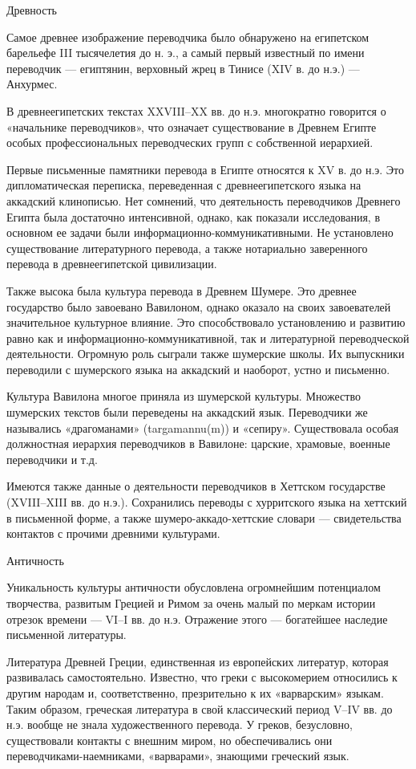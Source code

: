 Древность

Самое древнее изображение переводчика было обнаружено на египетском барельефе III тысячелетия до н. э., а самый первый известный по имени переводчик --- египтянин, верховный жрец в Тинисе (XIV в. до н.э.) --- Анхурмес.

В древнеегипетских текстах XXVIII--XX вв. до н.э. многократно говорится о «начальнике переводчиков», что означает существование в Древнем Египте особых профессиональных переводческих групп с собственной иерархией.

Первые письменные памятники перевода в Египте относятся к XV в. до н.э. Это дипломатическая переписка, переведенная с древнеегипетского языка на аккадский клинописью. Нет сомнений, что деятельность переводчиков Древнего Египта была достаточно интенсивной, однако, как показали исследования, в основном ее задачи были информационно-коммуникативными. Не установлено существование литературного перевода, а также нотариально заверенного перевода в древнеегипетской цивилизации.

Также высока была культура перевода в Древнем Шумере. Это древнее государство было завоевано Вавилоном, однако оказало на своих завоевателей значительное культурное влияние. Это способствовало установлению и развитию равно как и информационно-коммуникативной, так и литературной переводческой деятельности. Огромную роль сыграли также шумерские школы. Их выпускники переводили с шумерского языка на аккадский и наоборот, устно и письменно.

Культура Вавилона многое приняла из шумерской культуры. Множество шумерских текстов были переведены на аккадский язык. Переводчики же назывались «драгоманами» (targamannu(m)) и «сепиру». Существовала особая должностная иерархия переводчиков в Вавилоне: царские, храмовые, военные переводчики и т.д.

Имеются также данные о деятельности переводчиков в Хеттском государстве (XVIII--XIII вв. до н.э.). Сохранились переводы с хурритского языка на хеттский в письменной форме, а также шумеро-аккадо-хеттские словари --- свидетельства контактов с прочими древними культурами.

Античность

Уникальность культуры античности обусловлена огромнейшим потенциалом творчества, развитым Грецией и Римом за очень малый по меркам истории отрезок времени --- VI--I вв. до н.э. Отражение этого --- богатейшее наследие письменной литературы.

Литература Древней Греции, единственная из европейских литератур, которая развивалась самостоятельно. Известно, что греки с высокомерием относились к другим народам и, соответственно, презрительно к их «варварским» языкам. Таким образом, греческая литература в свой классический период V--IV вв. до н.э. вообще не знала художественного перевода. У греков, безусловно, существовали контакты с внешним миром, но обеспечивались они переводчиками-наемниками, «варварами», знающими греческий язык.

